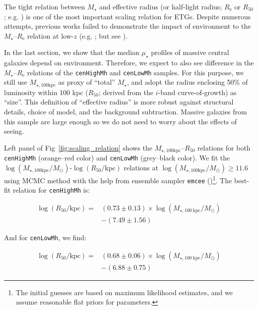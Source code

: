 \documentclass[a4paper,fleqn,usenatbib]{mnras}
\def\rbcg{\texttt{cenHighMh}}
\def\nbcg{\texttt{cenLowMh}}
\def\mstar{{$M_{\star}$}}
\def\mtot{{$M_{\star,100\mathrm{kpc}}$}}
\def\logmtot{{$\log (M_{\star,100\mathrm{kpc}}/M_{\odot})$}}
\def\mden{{$\mu_{\star}$}}
\begin{document}
    The tight relation between \mstar{} and effective radius (or half-light radius; 
    $R_{\mathrm{e}}$ or $R_{\mathrm{50}}$; e.g. \citealt{Shankar2013, Leja2013, 
    vdWel2014}) is one of the most important scaling relation for ETGs. 
    Despite numerous attempts, previous works failed to demonstrate the impact of 
    environment to the \mstar{}--$R_{\mathrm{e}}$ relation at low-$z$ 
    (e.g. \citealt{Weinmann2009, Nair2010, HCompany13, Cerbrian2014}; 
    but see \citealt{Yoon2017}). 
    
    In the last section, we show that the median \mden{} profiles of massive central 
    galaxies depend on environment. 
    Therefore, we expect to also see difference in the \mstar{}--$R_{\mathrm{e}}$ 
    relations of the \rbcg{} and \nbcg{} samples. 
    For this purpose, we still use \mtot{} as proxy of ``total'' \mstar{}, and adopt 
    the radius enclosing 50\% of luminosity within 100 kpc ($R_{\mathrm{50}}$; derived 
    from the $i$-band curve-of-growth) as ``size''. 
    This definition of ``effective radius'' is more robust against structural details, 
    choice of model, and the background subtraction. 
    Massive galaxies from this sample are large enough so we do not need to worry 
    about the effects of seeing.
    
    Left panel of Fig~\ref{fig:scaling_relation} shows the \mtot{}--$R_{\mathrm{50}}$
    relations for both \rbcg{} (orange--red color) and \nbcg{} (grey--black color). 
    We fit the \logmtot{}-$\log (R_{\mathrm{50}}/\mathrm{kpc})$ relations at 
    \logmtot{}$\geq 11.6$ using MCMC method with the help from ensemble sampler 
    \texttt{emcee} (\citealt{Emcee})\footnote{The initial guesses are based on maximum 
    likelihood estimates, and we assume reasonable flat priors for parameters.}.
    The best-fit relation for \rbcg{} is:
    
    \begin{equation}
        \begin{aligned}
        \log (R_{\mathrm{50}}/\mathrm{kpc}) = & (0.73\pm0.13) \times \log (M_{\star, 100\ \mathrm{kpc}}/M_{\odot}) \\ & -(7.49\pm1.56)
        \end{aligned}
    \end{equation}

    \noindent And for \nbcg{}, we find:
    
    \begin{equation}
        \begin{aligned}
        \log (R_{\mathrm{50}}/\mathrm{kpc}) = & (0.68\pm0.06) \times \log (M_{\star, 100\ \mathrm{kpc}}/M_{\odot}) \\ & -(6.88\pm0.75)
        \end{aligned}
    \end{equation}
    
\end{document}
